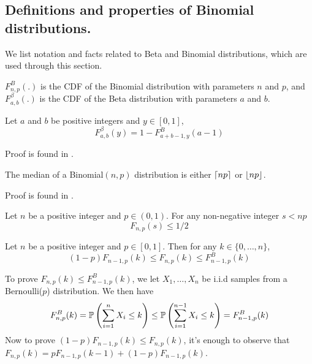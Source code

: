 \subsection{Definitions and properties of Binomial distributions.}
We list notation and facts related to Beta and Binomial distributions, which are used through this section.
\begin{definition}
	$F^B_{n,p}(.)$ is the CDF of the Binomial distribution with parameters $n$ and $p$, and $F^\beta_{a,b}(.)$ is the CDF of the Beta distribution with parameters $a$ and $b$.
\end{definition}

\begin{lemma} \label{fact:equation_for_beta_binomial_cdfs}
	Let $a$ and $b$ be positive integers and $y \in [0,1]$, 
	\[
	F^\beta_{a,b}(y) = 1 - F^B_{a+b-1,y}(a-1)
	\]
\end{lemma}
\begin{myproof}[Proof.]
	Proof is found in \cite{agrawalanalysis}.
\end{myproof}
\begin{lemma} \label{fact:median_of_binomial_dist}
	The median of a Binomial$(n,p)$ distribution is either $\ceil{np}$ or $\floor{np}$.
\end{lemma}
\begin{myproof}[Proof]
	Proof is found in \cite{jogdeo1968monotone}.
\end{myproof}

\begin{corollary} \label{cor:corollarly_of_binomial_median_property}
	Let $n$ be a positive integer and $p \in (0,1)$. For any non-negative integer $s < np$
	\[
	F_{n,p}(s) \le 1/2
	\]
\end{corollary}

\begin{lemma} \label{fact:relationship_with_binom_cdfs}
	Let $n$ be a positive integer and $p \in [0,1]$. Then for any $k \in \{0,\ldots,n\}$,
	\[
	(1-p)F_{n-1,p}(k)\le F_{n,p}(k) \le F^B_{n-1,p}(k)
	\] 
\end{lemma}
\begin{myproof}[Proof]
	To prove $F_{n,p}(k) \le F^B_{n-1,p}(k)$, we let $X_1,\ldots,X_{n}$ be i.i.d samples from a Bernoulli($p$) distribution. We then have
	\begin{align*}
	F^B_{n,p}(k)  = \P{\sum_{i=1}^{n} X_i \le k}  \le  \P{\sum_{i=1}^{n-1} X_i \le k}  = F^B_{n-1,p}(k)
	\end{align*}
	Now to prove $(1-p)F_{n-1,p}(k)\le F_{n,p}(k)$, it's enough to observe that $F_{n,p}(k) = p F_{n-1,p}(k-1) + (1-p) F_{n-1,p}(k)$.
\end{myproof}

